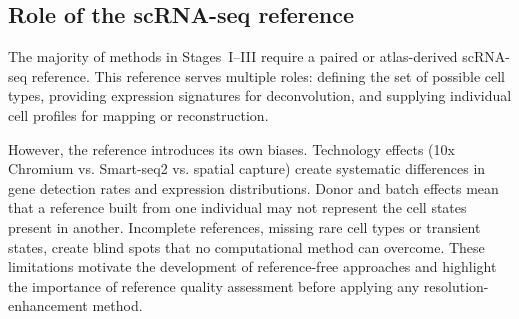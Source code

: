 \subsection{Role of the scRNA-seq reference}

The majority of methods in Stages~I--III require a paired or atlas-derived scRNA-seq reference. This reference serves multiple roles: defining the set of possible cell types, providing expression signatures for deconvolution, and supplying individual cell profiles for mapping or reconstruction.

However, the reference introduces its own biases. Technology effects (10x Chromium vs. Smart-seq2 vs. spatial capture) create systematic differences in gene detection rates and expression distributions. Donor and batch effects mean that a reference built from one individual may not represent the cell states present in another. Incomplete references, missing rare cell types or transient states, create blind spots that no computational method can overcome. These limitations motivate the development of reference-free approaches and highlight the importance of reference quality assessment before applying any resolution-enhancement method.


